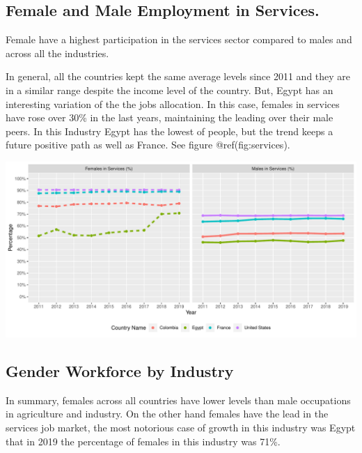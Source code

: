\documentclass[
]{article}
\begin{document}
\hypertarget{female-and-male-employment-in-services.}{%
\subsection{Female and Male Employment in
Services.}\label{female-and-male-employment-in-services.}}

Female have a highest participation in the services sector compared to
males and across all the industries.

In general, all the countries kept the same average levels since 2011
and they are in a similar range despite the income level of the country.
But, Egypt has an interesting variation of the the jobs allocation. In
this case, females in services have rose over 30\% in the last years,
maintaining the leading over their male peers. In this Industry Egypt
has the lowest of people, but the trend keeps a future positive path as
well as France. See figure @ref(fig:services).

\includegraphics{The_Outsiders_5513_files/figure-latex/services-1.pdf}

\hypertarget{gender-workforce-by-industry}{%
\subsection{Gender Workforce by
Industry}\label{gender-workforce-by-industry}}

In summary, females across all countries have lower levels than male
occupations in agriculture and industry. On the other hand females have
the lead in the services job market, the most notorious case of growth
in this industry was Egypt that in 2019 the percentage of females in
this industry was 71\%.
\end{document}
